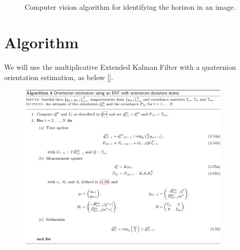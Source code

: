 \documentclass{article}
\begin{document}
\begin{figure}[H]%
 \centering
 \\
 \\
 \caption{Computer vision algorithm for identifying the horizon in an image.}%
 \label{fig:cv_alg}%
\end{figure}

\section{Algorithm} \label{sec:algorithm}
We will use the multiplicative Extended Kalman Filter with a quaternion orientation estimation, as below [\cite{introtoiner}].

\begin{figure}[ht]
  \centering
  \includegraphics[width=0.9\textwidth]{algo.png}
\end{figure}
\end{document}
